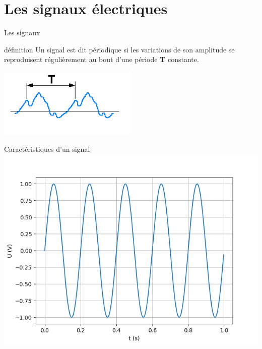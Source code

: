 \documentclass{beamer}
\begin{document}
    \section{Les signaux électriques}
    \begin{frame}{Les signaux}
        \begin{block}{définition}
        Un signal est dit périodique si les variations de son amplitude se reproduisent régulièrement au bout d'une période \textbf{T} constante.
        
        \begin{center}
            \includegraphics[width=0.5\textwidth]{Cours/Premieres/ETT/Seq03_alimenter/S03C01_chaine_energie_alimenter/images/Signal_periodique.png}
        \end{center}
        \end{block}
    \end{frame}
    
    \begin{frame}{Caractéristiques d'un signal}
        \includegraphics[width=.8\textwidth]{Cours/Premieres/ETT/Seq03_alimenter/S03C01_chaine_energie_alimenter/images/sinus.png}
    \end{frame}
    
\end{document}
